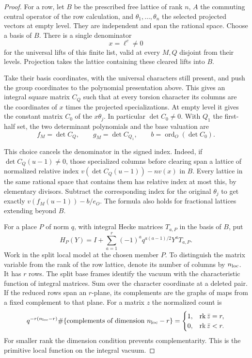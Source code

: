 \begin{proof}
For a row, let \(B\) be the prescribed free lattice of rank
\(n\), \(A\) the commuting central operator of the row
calculation, and \(\theta_1,\ldots,\theta_n\) the selected
projected vectors at empty level. They are independent and
span the rational space. Choose a basis of \(B\).
There is a single denominator
\[
 x=\ell^c\ne0
\]
for the
universal lifts of this finite list, valid at every \(M,Q\)
disjoint from their levels. Projection takes the lattice
containing these cleared lifts into \(B\).

Take their basis
coordinates, with the universal characters still present,
and push the group coordinates to the polynomial presentation
above. This gives an integral square matrix \(C_Q\) such
that at every torsion character its columns are the coordinates
of \(x\) times the projected specializations. At empty level
it gives the constant matrix \(C_0\) of the \(x\theta_j\).
In particular \(\det C_0\ne0\). With \(Q_1\) the first-half set, the two determinant polynomials and the base valuation are
\[
 f_M=\det C_Q,\qquad g_M=\det C_{Q_1},\qquad b=\operatorname{ord}_O(\det C_0).
\]

This choice cancels the denominator in the signed index.
Indeed, if \(\det C_Q(u-1)\ne0\), those specialized columns
before clearing span a lattice of normalized relative index
\(v(\det C_Q(u-1))-n v(x)\) in \(B\). Every lattice in
the same rational space that contains them has relative
index at most this, by elementary divisors. Subtract the
corresponding index for the original \(\theta_j\) to get
exactly \(v(f_M(u-1))-b/e_O\). The formula also holds for
fractional lattices extending beyond \(B\).

For a place \(P\) of norm \(q\), with integral Hecke matrices
\(T_{a,P}\) in the basis of \(B\), put
\[
 H_P(Y)=I+\sum_{a=1}^r(-1)^a q^{a(a-1)/2}Y^aT_{a,P}.
\]
Work in the split local model at the chosen member \(P\).
To distinguish the matrix variable from the rank of the row
lattice, denote its number of columns by \(n_{\rm loc}\).
It has \(r\) rows. The split base frames
identify the vacuum with the characteristic function of
integral matrices. Sum over the character coordinate at a
deleted pair. If the reduced rows span an \(r\)-plane, its
complements are the graphs of maps from a fixed complement
to that plane. For a matrix \(z\) the normalized count is
\[
 q^{-r(n_{\rm loc}-r)}
 \#\{\text{complements of dimension } n_{\rm loc}-r\}
 =
 \begin{cases}1,&\operatorname{rk}\bar z=r,\\0,&\operatorname{rk}\bar z<r.\end{cases}
\]
For smaller rank the dimension condition prevents complementarity.
This is the primitive local function on the integral vacuum.


\end{proof}
